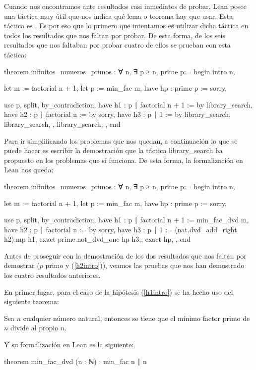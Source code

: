 Cuando nos encontramos ante resultados casi inmediatos de probar, Lean
posee una táctica muy útil que nos indica qué lema o teorema hay que
usar. Esta táctica es . Es por
eso que lo primero que intentamos es utilizar dicha táctica en todos los
resultados que nos faltan por probar. De esta forma, de los seis
resultados que nos faltaban por probar cuatro de ellos se prueban con
esta táctica:
\begin{leancode}
theorem infinitos_numeros_primos : ∀ n, ∃ p ≥ n, prime p:=
begin
  intro n,

  let m := factorial n + 1,
  let p := min_fac m,
  have hp : prime p := sorry,

  use p,
  split,
  { by_contradiction,
    have h1 : p ∣ factorial n + 1 := by library_search,
    have h2 : p ∣ factorial n := by sorry,
    have h3 : p ∣ 1 := by library_search,
    library_search, },
  { library_search, },
end
\end{leancode}

Para ir simplificando los problemas que nos quedan, a continuación lo
que se puede hacer es escribir la demostración que la táctica
 {library\_search} ha propuesto en los problemas
que sí funciona. De esta forma, la formalización en Lean nos queda:
\begin{leancode}
theorem infinitos_numeros_primos : ∀ n, ∃ p ≥ n, prime p:=
begin
  intro n,

  let m := factorial n + 1,
  let p := min_fac m,
  have hp : prime p := sorry,

  use p,
  split,
  { by_contradiction,
    have h1 : p ∣ factorial n + 1 := min_fac_dvd m,
    have h2 : p ∣ factorial n := by sorry,
    have h3 : p ∣ 1 := (nat.dvd_add_right h2).mp h1,
    exact prime.not_dvd_one hp h3,},
  { exact hp, },
end
\end{leancode}

Antes de proseguir con la demostración de los dos resultados que nos faltan
por demostrar (\(p\) primo y (\ref{h2intro})), veamos las pruebas que nos han
demostrado los cuatro resultados anteriores.

En primer lugar, para el caso de la hipótesis (\ref{h1intro}) se ha hecho uso
del siguiente teorema:
\begin{teorema}
  Sea \(n\) cualquier número natural, entonces se tiene que el mínimo factor
  primo de \(n\) divide al propio \(n\).
\end{teorema}
Y su formalización en Lean es la siguiente:
\begin{leancode}
theorem min_fac_dvd (n : ℕ) : min_fac n ∣ n
\end{leancode}

